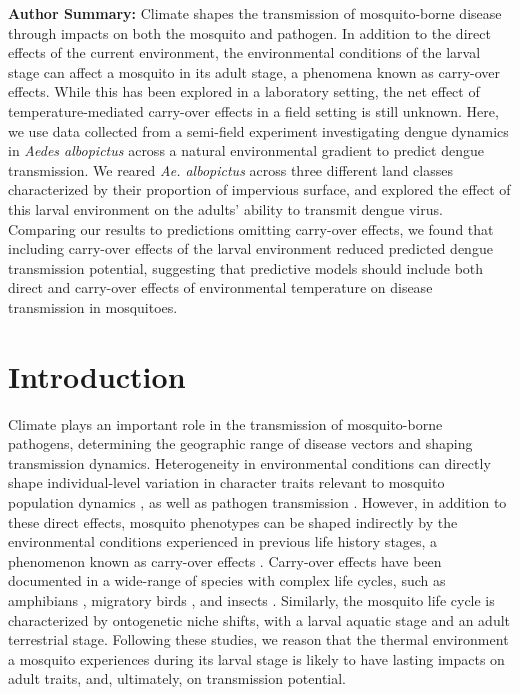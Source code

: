 \documentclass[12pt]{article}
\begin{document}
\bigskip

\textbf{Author Summary:} Climate shapes the transmission of mosquito-borne disease through impacts on both the mosquito and pathogen. In addition to the direct effects of the current environment, the environmental conditions of the larval stage can affect a mosquito in its adult stage, a phenomena known as carry-over effects. While this has been explored in a laboratory setting, the net effect of temperature-mediated carry-over effects in a field setting is still unknown. Here, we use data collected from a semi-field experiment investigating dengue dynamics in \textit{Aedes albopictus} across a natural environmental gradient to predict dengue transmission. We reared \textit{Ae. albopictus} across three different land classes characterized by their proportion of impervious surface, and explored the effect of this larval environment on the adults' ability to transmit dengue virus. Comparing our results to predictions omitting carry-over effects, we found that including carry-over effects of the larval environment reduced predicted dengue transmission potential, suggesting that predictive models should include both direct and carry-over effects of environmental temperature on disease transmission in mosquitoes.

\setlength\parindent{20pt}%

\newpage

\section{Introduction}

Climate plays an important role in the transmission of mosquito-borne pathogens, determining the geographic range of disease vectors and shaping transmission dynamics. Heterogeneity in environmental conditions can directly shape individual-level variation in character traits relevant to mosquito population dynamics \citep{delatte2009}, as well as pathogen transmission \citep{murdock2012}. However, in addition to these direct effects, mosquito phenotypes can be shaped indirectly by the environmental conditions experienced in previous life history stages, a phenomenon known as carry-over effects \citep{harrison2011}. Carry-over effects have been documented in a wide-range of species with complex life cycles, such as amphibians \citep{vonesh2005}, migratory birds \citep{norris2006}, and insects \citep{deblock2005a}. Similarly, the mosquito life cycle is characterized by ontogenetic niche shifts, with a larval aquatic stage and an adult terrestrial stage. Following these studies, we reason that the thermal environment a mosquito experiences during its larval stage is likely to have lasting impacts on adult traits, and, ultimately, on transmission potential.
\end{document}
